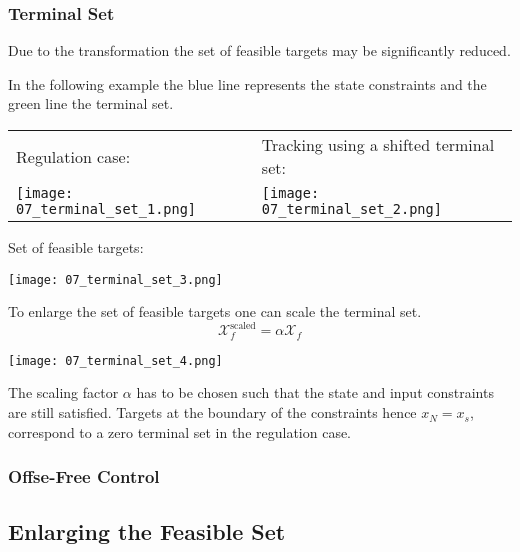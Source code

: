\subsubsection{Terminal Set}

Due to the transformation the set of feasible targets may be significantly reduced.

\newpar{}

In the following example the blue line represents the state constraints and the green line the terminal set.

\newpar{}

\begin{tabularx}{\linewidth}{YY}
    Regulation case:                                          & Tracking using a shifted terminal set: \\

    \texttt{[image: 07\_terminal\_set\_1.png]} &

    \texttt{[image: 07\_terminal\_set\_2.png]}
\end{tabularx}
\begin{center}
    Set of feasible targets:

    \texttt{[image: 07\_terminal\_set\_3.png]}
\end{center}

To enlarge the set of feasible targets one can scale the terminal set.
\begin{equation*}
    \mathcal{X}_f^{\text{scaled}} = \alpha \mathcal{X}_f
\end{equation*}
\begin{center}
    \texttt{[image: 07\_terminal\_set\_4.png]}
\end{center}

The scaling factor $\alpha$ has to be chosen such that the state and input constraints are still satisfied.
Targets at the boundary of the constraints hence $x_N = x_s$, correspond to a zero terminal set in the regulation case.

\subsubsection{Offse-Free Control}

\subsection{Enlarging the Feasible Set}